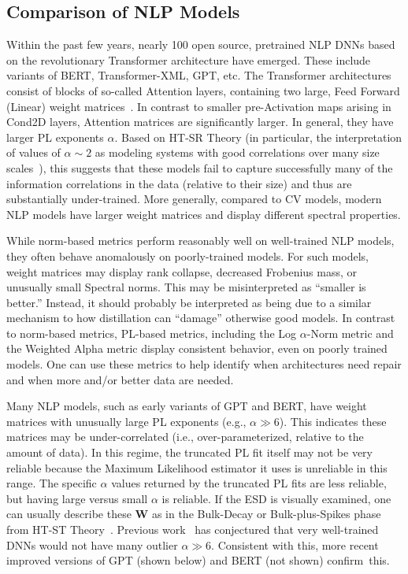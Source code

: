 \subsection{Comparison of NLP Models}
\label{sxn:nlp}

Within the past few years, nearly 100 open source, pretrained NLP DNNs based on the revolutionary Transformer architecture have emerged.
These include variants of BERT, Transformer-XML, GPT, etc.
The Transformer architectures consist of blocks of so-called Attention layers, containing two large, Feed Forward (Linear) weight matrices~\cite{Attn2017}. 
In contrast to smaller pre-Activation maps arising in Cond2D layers, Attention matrices are significantly larger.
In general, they have larger PL exponents $\alpha$.
Based on HT-SR Theory
(in particular, the interpretation of values of $\alpha \sim 2$ as modeling systems with good correlations over many size scales~\cite{BouchaudPotters03, SornetteBook}), 
this suggests that these models fail to capture successfully many of the information correlations in the data (relative to their size) and thus are substantially under-trained.
More generally, compared to CV models,
modern NLP models have larger weight matrices and display different spectral properties.

While norm-based metrics perform reasonably well on well-trained NLP models, they often behave anomalously on poorly-trained models.
For such models, weight matrices may display rank collapse, decreased Frobenius mass, or unusually small Spectral norms.
This may be misinterpreted as ``smaller is better.'' 
Instead, it should probably be interpreted as being due to a similar mechanism to how distillation can ``damage'' otherwise good models.
In contrast to norm-based metrics, PL-based metrics, including the Log $\alpha$-Norm metric and the Weighted Alpha metric display consistent behavior, even on poorly trained models.
One can use these metrics to help identify when architectures need repair and when more and/or better data are needed.

Many NLP models, such as early variants of GPT and BERT, have weight matrices with unusually large PL exponents (e.g., $\alpha\gg 6$).
This indicates these matrices may be under-correlated (i.e., over-parameterized, relative to the amount of data).
In this regime, the truncated PL fit itself may not be very reliable because the Maximum Likelihood estimator it uses is unreliable in this range.
The specific $\alpha$ values returned by the truncated PL fits are less reliable, but having large versus small $\alpha$ is reliable.
If the ESD is visually examined, one can usually describe these $\mathbf{W}$ as in the Bulk-Decay or Bulk-plus-Spikes phase from HT-ST Theory~\cite{MM18_TR,MM19_HTSR_ICML}.
Previous work~\cite{MM18_TR,MM19_HTSR_ICML} has conjectured that very well-trained DNNs would not have many outlier $\alpha\gg 6$.
Consistent with this, more recent improved versions of GPT (shown below) and BERT (not shown) confirm~this.


